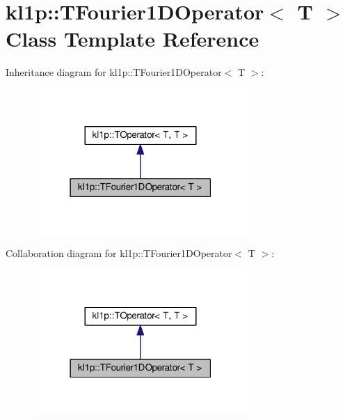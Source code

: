 \hypertarget{classkl1p_1_1TFourier1DOperator}{}\section{kl1p\+:\+:T\+Fourier1\+D\+Operator$<$ T $>$ Class Template Reference}
\label{classkl1p_1_1TFourier1DOperator}


Inheritance diagram for kl1p\+:\+:T\+Fourier1\+D\+Operator$<$ T $>$\+:
\nopagebreak
\begin{figure}[H]
\begin{center}
\leavevmode
\includegraphics[width=231pt]{classkl1p_1_1TFourier1DOperator__inherit__graph}
\end{center}
\end{figure}


Collaboration diagram for kl1p\+:\+:T\+Fourier1\+D\+Operator$<$ T $>$\+:
\nopagebreak
\begin{figure}[H]
\begin{center}
\leavevmode
\includegraphics[width=231pt]{classkl1p_1_1TFourier1DOperator__coll__graph}
\end{center}
\end{figure}
